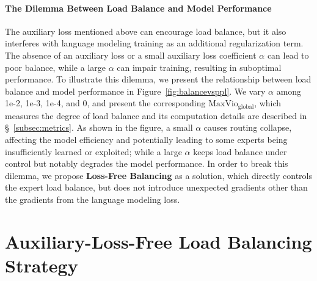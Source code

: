 \documentclass{article} %
\newcommand{\ours}{Loss-Free Balancing}
\begin{document}
\paragraph{The Dilemma Between Load Balance and Model Performance}
\label{par:dilemma_balance_performance}
The auxiliary loss mentioned above can encourage load balance, but it also interferes with language modeling training as an additional regularization term. The absence of an auxiliary loss or a small auxiliary loss coefficient $\alpha$ can lead to poor balance, while a large $\alpha$ can impair training, resulting in suboptimal performance. 
To illustrate this dilemma, we present the relationship between load balance and model performance in Figure~\ref{fig:balancevsppl}. 
We vary $\alpha$ among 1e-2, 1e-3, 1e-4, and 0, and present the corresponding $\text{MaxVio}_\text{global}$, which measures the degree of load balance and its computation details are described in \S~\ref{subsec:metrics}.
As shown in the figure, a small $\alpha$ causes routing collapse, affecting the model efficiency and potentially leading to some experts being insufficiently learned or exploited; while a large $\alpha$ keeps load balance under control but notably degrades the model performance. 
In order to break this dilemma, we propose \textbf{\ours{}} as a solution, which directly controls the expert load balance, but does not introduce unexpected gradients other than the gradients from the language modeling loss. 


\section{Auxiliary-Loss-Free Load Balancing Strategy}
\label{sec:FBC-Gate}
\end{document}
